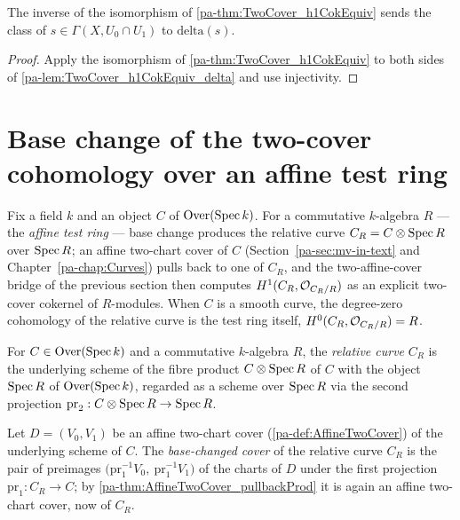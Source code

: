 \begin{lemma}
  \label{pa-lem:TwoCover_h1CokEquiv_symm_mk}
  \leanok

  The inverse of the isomorphism of \ref{pa-thm:TwoCover_h1CokEquiv} sends the class of
  \(s \in \Gamma(X, U_0 \cap U_1)\) to \(\mathrm{delta}(s)\).
\end{lemma}
\begin{proof}
  \leanok
  Apply the isomorphism of \ref{pa-thm:TwoCover_h1CokEquiv} to both sides of
  \ref{pa-lem:TwoCover_h1CokEquiv_delta} and use injectivity.
\end{proof}

\section{Base change of the two-cover cohomology over an affine test ring}

Fix a field \(k\) and an object \(C\) of \(\mathrm{Over}(\operatorname{Spec} k)\). For a commutative \(k\)-algebra \(R\)
--- the \emph{affine test ring} --- base change produces the relative curve
\(C_R = C \otimes \operatorname{Spec} R\) over \(\operatorname{Spec} R\); an affine two-chart cover of \(C\)
(Section~\ref{pa-sec:mv-in-text} and Chapter~\ref{pa-chap:Curves}) pulls back to one of \(C_R\), and the
two-affine-cover bridge of the previous section then computes \(H^1(C_R, \mathcal{O}_{C_R/R})\) as an
explicit two-cover cokernel of \(R\)-modules. When \(C\) is a smooth curve, the degree-zero
cohomology of the relative curve is the test ring itself, \(H^0(C_R, \mathcal{O}_{C_R/R}) = R\).

\begin{definition}
  \label{pa-def:relCurve}
  \leanok

  For \(C \in \mathrm{Over}(\operatorname{Spec} k)\) and a commutative \(k\)-algebra \(R\), the \emph{relative curve}
  \(C_R\) is the underlying scheme of the fibre product \(C \otimes \operatorname{Spec} R\) of \(C\) with the
  object \(\operatorname{Spec} R\) of \(\mathrm{Over}(\operatorname{Spec} k)\), regarded as a scheme over \(\operatorname{Spec} R\) via the second
  projection \(\mathrm{pr}_2 : C \otimes \operatorname{Spec} R \to \operatorname{Spec} R\).
\end{definition}

\begin{definition}
  \label{pa-def:relCover}
  \leanok

  Let \(D = (V_0, V_1)\) be an affine two-chart cover (\ref{pa-def:AffineTwoCover}) of the underlying
  scheme of \(C\). The \emph{base-changed cover} of the relative curve \(C_R\) is the pair of
  preimages \(\bigl(\mathrm{pr}_1^{-1} V_0,\ \mathrm{pr}_1^{-1} V_1\bigr)\) of the charts of \(D\)
  under the first projection \(\mathrm{pr}_1 : C_R \to C\); by
  \ref{pa-thm:AffineTwoCover_pullbackProd} it is again an affine two-chart cover, now of \(C_R\).
\end{definition}


